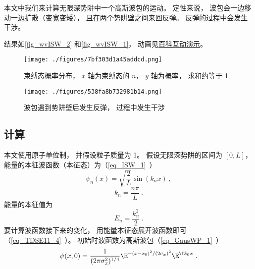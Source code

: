 

本文中我们来计算无限深势阱中一个高斯波包的运动。 定性来说， 波包会一边移动一边扩散（变宽变矮）， 且在两个势阱壁之间来回反弹。 反弹的过程中会发生干涉。

结果如\autoref{fig_wvISW_2} 和\autoref{fig_wvISW_1}， 动画见\href{https://wuli.wiki/apps/wvISW.html}{百科互动演示}。

\begin{figure}[ht]
\centering
\texttt{[image: ./figures/7bf303d1a45addcd.png]}
\caption{束缚态概率分布， $x$ 轴为束缚态的 $n$， $y$ 轴为概率， 求和约等于 1} \label{fig_wvISW_2}
\end{figure}

\begin{figure}[ht]
\centering
\texttt{[image: ./figures/538fa8b732981b14.png]}
\caption{波包遇到势阱壁后发生反弹， 过程中发生干涉} \label{fig_wvISW_1}
\end{figure}

\subsection{计算}

本文使用原子单位制， 并假设粒子质量为 1。 假设无限深势阱的区间为 $[0, L]$， 能量的本征波函数（本征态）为（\autoref{eq_ISW_1}~）
\begin{equation}
\psi _n(x) = \sqrt{\frac{2}{L}} \sin(k_n x)~,
\end{equation}
\begin{equation}
k_n = \frac{n\pi }{L}~.
\end{equation}
能量的本征值为
\begin{equation}
E_n = \frac{k_n^2}{2}~.
\end{equation}
要计算波函数接下来的变化， 用能量本征态展开波函数即可（\autoref{eq_TDSE11_4}~）。 初始时波函数为高斯波包（\autoref{eq_GausWP_1}~）
\begin{equation}
\psi (x,0) = \frac{1}{(2\pi \sigma _x ^2)^{1/4}} \E^{-(x - x_0)^2/(2\sigma _x)^2} \E^{\I k_0x}~.
\end{equation}


